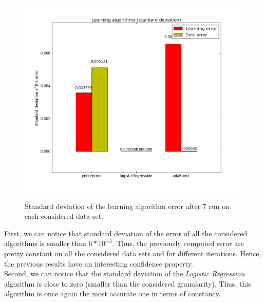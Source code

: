 \documentclass[12pt]{article}											%
\begin{document}
\begin{figure}[t]
\begin{center}
	\subfloat
    {
		\includegraphics[width=.6\hsize]{chart/learningAlgoComparison_errorStandardDeviation.png}
	}
	\caption{Standard deviation of the learning algorithm error after 7 run on each considered data set.}
	\label{learningAlgoComparison_stdDeviation.png}
\end{center}
\end{figure}


First, we can notice that standard deviation of the error of all the considered algorithms is smaller than $6 * 10^{-3}$.   Thus, the previously computed error are pretty constant on all the considered data sets and for different iterations.   Hence, the previous results have an interesting confidence property.\\

Second, we can notice that the standard deviation of the \emph{Logistic Regression} algorithm is close to zero (smaller than the considered granularity).   Thus, this algorithm is once again the most accurate one in terms of constancy.


\end{document}
